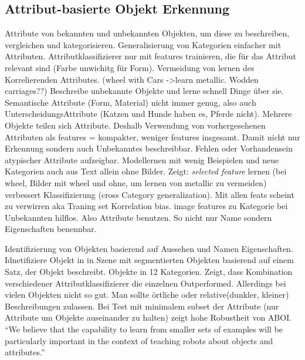 \subsection{Attribut-basierte Objekt Erkennung}
\label{sec:aboi}

\cite{descObjbyAtr} \newline
Attribute von bekannten und unbekannten Objekten, um diese zu beschreiben, vergleichen und kategorisieren. Generalisierung von Kategorien einfacher mit Attributen. Attributklassifizierer nur mit features trainieren, die für das Attribut relevant sind (Farbe unwichitg für Form). Vermeidung von lernen des Korrelierenden Attributes. (wheel with Cars ->learn metallic. Wodden carriages??)\newline
Beschreibe unbekannte Objekte und lerne schnell Dinge über sie. \newline 
Semantische Attribute (Form, Material) nicht immer genug, also auch UnterscheidungsAttribute (Katzen und Hunde haben es, Pferde nicht).\newline
Mehrere Objekte teilen sich Attribute. Deshalb Verwendung von vorhergesehenen Attributen als features = kompakter, weniger features insgesamt. Damit nicht nur Erkennung sondern auch Unbekanntes beschreibbar. Fehlen oder Vorhandensein atypischer Attribute aufzeigbar. Modellernen mit wenig Beispielen und neue Kategorien auch aus Text allein ohne Bilder. \newline
Zeigt: \textit{selected feature} lernen (bei wheel, Bilder mit wheel und ohne, um lernen von metallic zu vermeiden) verbessert Klassifizierung (cross Category generalization). Mit allen feats scheint zu verwirren aka Traning set Korrelation bias. \newline
image features zu Kategorie bei Unbekannten hilflos. Also Attribute benutzen. So nicht nur Name sondern Eigenschaften benennbar.

\par

\cite{atrBasedObjIden} \newline
Identifizierung von Objekten basierend auf Aussehen und Namen Eigenschaften. \newline
Idnetifiziere Objekt in in Szene mit segmentierten Objekten basierend auf einem Satz, der Objekt beschreibt.  Objekte in 12 Kategorien. \newline
Zeigt, dass Kombination verschiedener Attributklassifizierer die einzelnen Outperformed. Allerdings bei vielen Objekten nicht so gut. Man sollte örtliche oder relative(dunkler, kleiner) Beschreibungen zulassen. Bei Test mit minimalem subset der Attribute (nur Attribute um Objekte auseinander zu halten) zeigt hohe Robustheit von ABOI.
``We believe that the capability to learn from smaller sets
of examples will be particularly important in the context of
teaching robots about objects and attributes.'' \par


